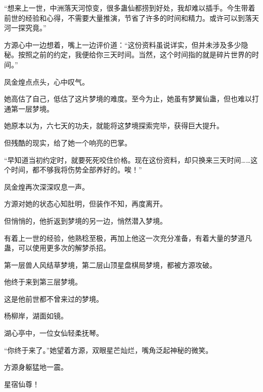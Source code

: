 \begin{this_body}
“想来上一世，中洲落天河惊变，很多蛊仙都捞到好处，我却难以插手。今生带着前世的经验和心得，不需要大量推演，节省了许多的时间和精力。或许可以到落天河一探究竟。”

方源心中一边想着，嘴上一边评价道：“这份资料虽说详实，但并未涉及多少隐秘。按照之前的约定，我便给你三天时间。当然，这个时间指的就是碎片世界的时间。”

凤金煌点点头，心中叹气。

她高估了自己，低估了这片梦境的难度。至今为止，她虽有梦翼仙蛊，但也难以打通第一层梦境。

她原本以为，六七天的功夫，就能将这梦境探索完毕，获得巨大提升。

但残酷的现实，给了她一个响亮的巴掌。

“早知道当初约定时，就要死死咬住价格。现在这份资料，却只换来三天时间……这个时间，都不够我将伤势全部养好的。唉！”

凤金煌再次深深叹息一声。

方源对她的状态心知肚明，但装作不知，再度离开。

但悄悄的，他折返到梦境的另一边，悄然潜入梦境。

有着上一世的经验，他熟稔至极，再加上他这一次充分准备，有着大量的梦道凡蛊，可以使用更多次的解梦杀招。

第一层兽人风结草梦境，第二层山顶星盘棋局梦境，都被方源攻破。

他终于来到第三层梦境。

这是他前世都不曾来过的梦境。

杨柳岸，湖面如镜。

湖心亭中，一位女仙轻柔抚琴。

“你终于来了。”她望着方源，双眼星芒灿烂，嘴角泛起神秘的微笑。

方源身躯猛地一震。

星宿仙尊！

\end{this_body}

